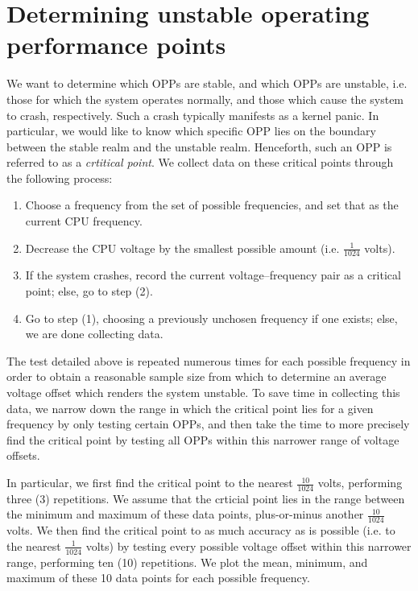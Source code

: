 \section{Determining unstable operating performance points}
\label{sec:unstableOPPs}

We want to determine which OPPs are stable, and which OPPs are unstable, i.e.
those for which the system operates normally, and those which cause the system
to crash, respectively. Such a crash typically manifests as a kernel panic.
In particular, we would like to know which specific OPP lies on the boundary
between the stable realm and the unstable realm. Henceforth, such an OPP is
referred to as a \emph{crtitical point}. We collect data on these critical
points through the following process:
\begin{enumerate}
    \item Choose a frequency from the set of possible frequencies, and set that
        as the current CPU frequency.
    \item Decrease the CPU voltage by the smallest possible amount
        (i.e. $\frac{1}{1024}$ volts).
    \item If the system crashes, record the current voltage–frequency pair as a
        critical point; else, go to step (2).
    \item Go to step (1), choosing a previously unchosen frequency if one
        exists; else, we are done collecting data.
\end{enumerate}

The test detailed above is repeated numerous times for each possible frequency
in order to obtain a reasonable sample size from which to determine an average
voltage offset which renders the system unstable. To save time in collecting
this data, we narrow down the range in which the critical point lies for a
given frequency by only testing certain OPPs, and then take the time to more
precisely find the critical point by testing all OPPs within this narrower
range of voltage offsets.

In particular, we first find the critical point to the nearest $\frac{10}{1024}$
volts, performing three (3) repetitions. We assume that the crticial point lies
in the range between the minimum and maximum of these data points, plus-or-minus
another $\frac{10}{1024}$ volts. We then find the critical point to as much
accuracy as is possible (i.e. to the nearest $\frac{1}{1024}$ volts) by testing
every possible voltage offset within this narrower range, performing ten (10)
repetitions. We plot the mean, minimum, and maximum of these 10 data points for
each possible frequency.

